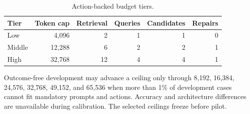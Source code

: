 \begin{table}[H]
\centering
\small
\caption{Action-backed budget tiers.}
\label{tab:budgets}
\begin{tabular}{lrrrrr}
\toprule
Tier & Token cap & Retrieval & Queries & Candidates & Repairs \\
\midrule
Low & 4,096 & 2 & 1 & 1 & 0 \\
Middle & 12,288 & 6 & 2 & 2 & 1 \\
High & 32,768 & 12 & 4 & 4 & 1 \\
\bottomrule
\end{tabular}
\end{table}

Outcome-free development may advance a ceiling only through 8,192, 16,384,
24,576, 32,768, 49,152, and 65,536 when more than 1\% of development cases
cannot fit mandatory prompts and actions. Accuracy and architecture differences
are unavailable during calibration. The selected ceilings freeze before pilot.
